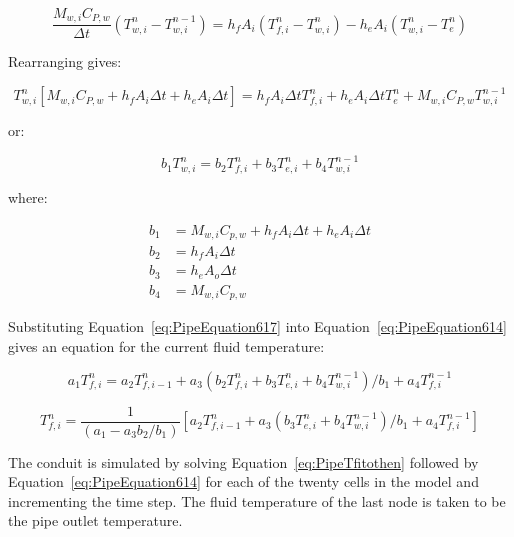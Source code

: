 \begin{equation}
\frac{{{M_{w,i}}{C_{P,w}}}}{{\Delta t}}\left( {T_{w,i}^n - T_{w,i}^{n - 1}} \right) = {h_f}{A_i}\left( {T_{f,i}^n - T_{w,i}^n} \right) - {h_e}{A_i}\left( {T_{w,i}^n - T_e^n} \right)
\end{equation}

Rearranging gives:

\begin{equation}
T_{w,i}^n\left[ {{M_{w,i}}{C_{P,w}} + {h_f}{A_i}\Delta t + {h_e}{A_i}\Delta t} \right] = {h_f}{A_i}\Delta tT_{f,i}^n + {h_e}{A_i}\Delta tT_e^n + {M_{w,i}}{C_{P,w}}T_{w,i}^{n - 1}
\end{equation}

or:

\begin{equation}
{b_1}T_{w,i}^n = {b_2}T_{f,i}^n + {b_3}T_{e,i}^n + {b_4}T_{w,i}^{n - 1}
\label{eq:PipeEquation617}
\end{equation}

where:

\begin{equation}
  \begin{array}{rl}
    b_1 &= M_{w,i} C_{p,w} + h_f A_i \Delta t + h_e A_i \Delta t \\
    b_2 &= h_f A_i \Delta t \\
    b_3 &= h_e A_o \Delta t \\
    b_4 &= M_{w,i} C_{p,w}
  \end{array}
\end{equation}

Substituting Equation~\ref{eq:PipeEquation617} into Equation~\ref{eq:PipeEquation614} gives an equation for the current fluid temperature:

\begin{equation}
{a_1}T_{f,i}^n = {a_2}T_{f,i - 1}^n + {a_3}\left( {{b_2}T_{f,i}^n + {b_3}T_{e,i}^n + {b_4}T_{w,i}^{n - 1}} \right)/{b_1} + {a_4}T_{f,i}^{n - 1}
\end{equation}

\begin{equation}
T_{f,i}^n = \frac{1}{{\left( {{a_1} - {a_3}{b_2}/{b_1}} \right)}}\left[ {{a_2}T_{f,i - 1}^n + {a_3}\left( {{b_3}T_{e,i}^n + {b_4}T_{w,i}^{n - 1}} \right)/{b_1} + {a_4}T_{f,i}^{n - 1}} \right]
\label{eq:PipeTfitothen}
\end{equation}

The conduit is simulated by solving Equation~\ref{eq:PipeTfitothen} followed by Equation~\ref{eq:PipeEquation614} for each of the twenty cells in the model and incrementing the time step. The fluid temperature of the last node is taken to be the pipe outlet temperature.

